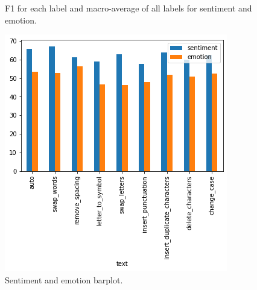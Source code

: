 \documentclass[11pt,a4paper]{article}
\begin{document}
\begin{figure}[ht]
    \centering
    \caption{F1 for each label and macro-average of all labels for sentiment and emotion.}
    \label{fig:barplots}
\end{figure}

\begin{figure}[ht]
    \centering
    \includegraphics[width=\linewidth]{barplot_sentiment_emotion.png}
    \caption{Sentiment and emotion barplot.}
    \label{fig:barplot}
\end{figure}
\end{document}
